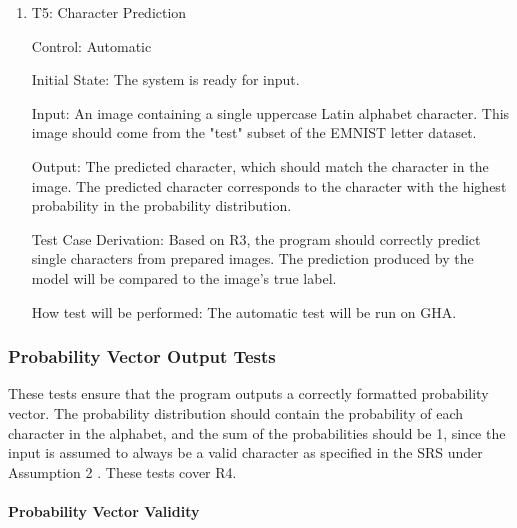\documentclass[12pt, titlepage]{article}
\begin{document}
\begin{enumerate}

\item{T5: Character Prediction\\}

Control: Automatic

Initial State: The \progname{} system is ready for input.

Input: An image containing a single uppercase Latin alphabet character. This
image should come from the "test" subset of the EMNIST letter dataset.

Output: The predicted character, which should match the character in the image.
The predicted character corresponds to the character with the highest
probability in the probability distribution.

Test Case Derivation: Based on R3, the program should correctly predict single
characters from prepared images. The prediction produced by the model will be
compared to the image's true label.

How test will be performed: The automatic test will be run on GHA.

\end{enumerate}

\subsubsection{Probability Vector Output Tests}

These tests ensure that the program outputs a correctly formatted probability
vector. The probability distribution should contain the probability of each character
in the alphabet, and the sum of the probabilities should be 1, since the
input is assumed to always be a valid character as specified in the SRS
under Assumption 2 \citep{SRS}. These tests cover R4.

\paragraph{Probability Vector Validity}
\end{document}
